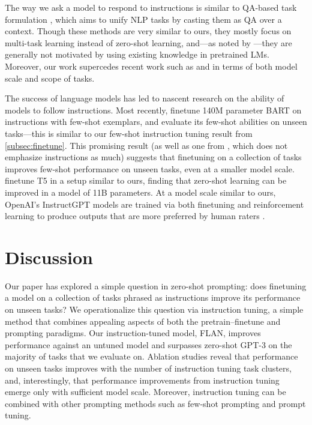 \documentclass{article} %
\newcommand{\flan}{FLAN}
\begin{document}
The way we ask a model to respond to instructions is similar to QA-based task formulation \citep{kumar2016ask,mccann2018natural}, which aims to unify NLP tasks by casting them as QA over a context.
Though these methods are very similar to ours, they mostly focus on multi-task learning instead of zero-shot learning, and---as noted by \citet{liu2021survey}---they are generally not motivated by using existing knowledge in pretrained LMs.
Moreover, our work supercedes recent work such as \citet{chai2020description} and \citet{zhong2021meta} in terms of both model scale and scope of tasks.

The success of language models has led to nascent research on the ability of models to follow instructions. 
Most recently, \citet{mishra2021natural} finetune 140M parameter BART on instructions with few-shot exemplars, and evaluate its few-shot abilities on unseen tasks---this is similar to our few-shot instruction tuning result from \cref{subsec:finetune}.
This promising result (as well as one from \citet{ye2021crossfit}, which does not emphasize instructions as much) suggests that finetuning on a collection of tasks improves few-shot performance on unseen tasks, even at a smaller model scale.
\citet{sanh2021multitask} finetune T5 in a setup similar to ours, finding that zero-shot learning can be improved in a model of 11B parameters.
At a model scale similar to ours, OpenAI's InstructGPT models are trained via both finetuning and reinforcement learning to produce outputs that are more preferred by human raters \citep{ouyang2022instructgpt}.

\section{Discussion}

Our paper has explored a simple question in zero-shot prompting: does finetuning a model on a collection of tasks phrased as instructions improve its performance on unseen tasks?
We operationalize this question via instruction tuning, a simple method that combines appealing aspects of both the pretrain--finetune and prompting paradigms.
Our instruction-tuned model, \flan{}, improves performance against an untuned model and surpasses zero-shot GPT-3 on the majority of tasks that we evaluate on.
Ablation studies reveal that performance on unseen tasks improves with the number of instruction tuning task clusters, and, interestingly, that performance improvements from instruction tuning emerge only with sufficient model scale.
Moreover, instruction tuning can be combined with other prompting methods such as few-shot prompting and prompt tuning.
\end{document}

